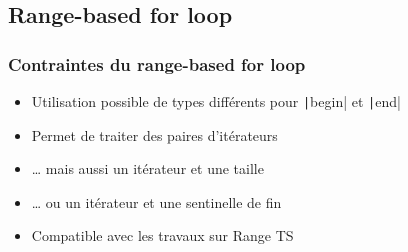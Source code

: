 \documentclass[C++.tex]{subfiles}
\begin{document}
\begin{frame}[fragile]

\end{frame}

\subsection*{Range-based for loop}
\begin{frame}[fragile]
	\frametitle{Contraintes du range-based for loop}
	\begin{itemize}
		\item Utilisation possible de types différents pour \texttt|begin| et \texttt|end|
		\item Permet de traiter des paires d'itérateurs
		\item \ldots{} mais aussi un itérateur et une taille
		\item \ldots{} ou un itérateur et une sentinelle de fin
		\item Compatible avec les travaux sur Range TS
	\end{itemize}

\end{frame}
\end{document}
